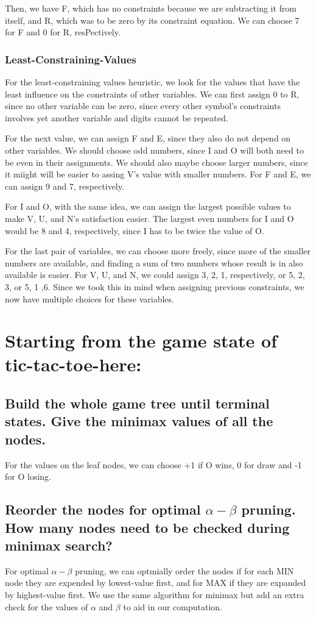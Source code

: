 \documentclass{article}
\begin{document}
		Then, we have F, which has no constraints because we are subtracting it from itself, and R, which was to
		be zero by its constraint equation. We can choose 7 for F and 0 for R, resPectively.
		\subsubsection{Least-Constraining-Values}
		For the least-constraining values heuristic, we look for the values that have the least influence 
		on the constraints of other variables. We can first assign 0 to R, since no other variable can 
		be zero, since every other symbol's constraints involves yet another variable and digits cannot
		be repeated.

		For the next value, we can assign F and E, since they also do not depend on other variables. We 
		should choose odd numbers, since I and O will both need to be even in their assignments. We 
		should also maybe choose larger numbers, since it miight will be easier to assing V's value 
		with smaller numbers. For F and E, we can assign 9 and 7, respectively.

		For I and O, with the same idea, we can assign the largest possible values to make V, U, and N's
		satisfaction easier. The largest even numbers for I and O would be 8 and 4, respectively, since I 
		has to be twice the value of O.

		For the last pair of variables, we can choose more freely, since more of the smaller numbers are
		available, and finding a sum of two numbers whose result is in also available is easier. For
		V, U, and N, we could assign 3, 2, 1, respectively, or 5, 2, 3, or 5, 1 ,6. Since we took this 
		in mind when assigning previous constraints, we now have multiple choices for these variables.
\section{Starting from the game state of tic-tac-toe-here:}
	\subsection{Build the whole game tree until terminal states. Give the minimax values of all the nodes.}
		For the values on the leaf nodes, we can choose +1 if O wins, 0 for draw and -1 for O losing.
	\subsection{Reorder the nodes for optimal $\alpha-\beta$ pruning. How many nodes need to be checked 
	during minimax search?}
		For optimal $\alpha-\beta$ pruning, we can optmially order the nodes if for each MIN node they 
		are expended by lowest-value first, and for MAX if they are expanded by highest-value first. 
		We use the same algorithm for minimax but add an extra check for the values of $\alpha$ and $\beta$
		to aid in our computation.
\end{document}
